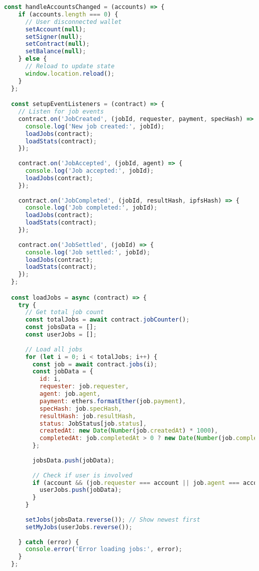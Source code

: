 \begin{lstlisting}[language=JavaScript,caption={App.jsx - Main React Application}]
  const handleAccountsChanged = (accounts) => {
    if (accounts.length === 0) {
      // User disconnected wallet
      setAccount(null);
      setSigner(null);
      setContract(null);
      setBalance(null);
    } else {
      // Reload to update state
      window.location.reload();
    }
  };

  const setupEventListeners = (contract) => {
    // Listen for job events
    contract.on('JobCreated', (jobId, requester, payment, specHash) => {
      console.log('New job created:', jobId);
      loadJobs(contract);
      loadStats(contract);
    });
    
    contract.on('JobAccepted', (jobId, agent) => {
      console.log('Job accepted:', jobId);
      loadJobs(contract);
    });
    
    contract.on('JobCompleted', (jobId, resultHash, ipfsHash) => {
      console.log('Job completed:', jobId);
      loadJobs(contract);
      loadStats(contract);
    });
    
    contract.on('JobSettled', (jobId) => {
      console.log('Job settled:', jobId);
      loadJobs(contract);
      loadStats(contract);
    });
  };

  const loadJobs = async (contract) => {
    try {
      // Get total job count
      const totalJobs = await contract.jobCounter();
      const jobsData = [];
      const userJobs = [];
      
      // Load all jobs
      for (let i = 0; i < totalJobs; i++) {
        const job = await contract.jobs(i);
        const jobData = {
          id: i,
          requester: job.requester,
          agent: job.agent,
          payment: ethers.formatEther(job.payment),
          specHash: job.specHash,
          resultHash: job.resultHash,
          status: JobStatus[job.status],
          createdAt: new Date(Number(job.createdAt) * 1000),
          completedAt: job.completedAt > 0 ? new Date(Number(job.completedAt) * 1000) : null
        };
        
        jobsData.push(jobData);
        
        // Check if user is involved
        if (account && (job.requester === account || job.agent === account)) {
          userJobs.push(jobData);
        }
      }
      
      setJobs(jobsData.reverse()); // Show newest first
      setMyJobs(userJobs.reverse());
      
    } catch (error) {
      console.error('Error loading jobs:', error);
    }
  };


\end{lstlisting}
